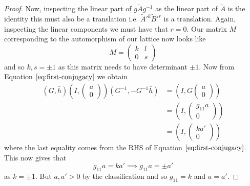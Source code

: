 \begin{proof}
    Now, inspecting the linear part of $g\tilde{A}g^{-1}$ as the linear part of
    $\tilde{A}$ is the identity this must also be a translation i.e. $\tilde{A}'^k
        \tilde{B}'^r$ is a translation. Again, inspecting the linear components we must
    have that $r=0$. Our matrix $M$ corresponding to the automorphism of our
    lattice now looks like $$M = \begin{pmatrix}
            k & l \\
            0 & s
        \end{pmatrix}$$
    and so $k,s = \pm 1$ as this matrix needs to have determinant $\pm 1$. Now from Equation $\ref{eq:first-conjugacy}$ we obtain
    \begin{align*}
        \left(G, \bar{h}\right) \left(I, \begin{pmatrix}
                                                 a \\ 0
                                             \end{pmatrix}\right) \left(G^{-1}, -G^{-1}\bar{h}\right) & = \left(I, G\begin{pmatrix}
                                                                                                                        a \\ 0
                                                                                                                    \end{pmatrix}\right) \\
                                                                 & = \left(I, \begin{pmatrix}
                                                                                      g_{11}a \\ 0
                                                                                  \end{pmatrix}\right)                                   \\
                                                                 & = \left(I, \begin{pmatrix}
                                                                                      ka' \\ 0
                                                                                  \end{pmatrix}\right)
    \end{align*}where the last equality comes from the RHS of Equation $\ref{eq:first-conjugacy}$. This now gives that
    $$g_{11} a = ka' \implies g_{11} a = \pm a'$$
    as $k = \pm 1$. But $a,a' > 0$ by the classification and so $g_{11} = k$ and $a = a'$.


\end{proof}

